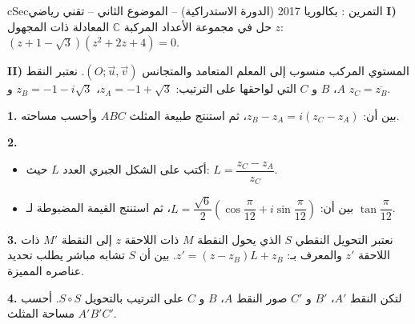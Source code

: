 \documentclass[12pt,a4paper]{article}
\newenvironment{BOX}[2]{\begin{otherlanguage}{english}\begin{arbox}{#1}{#2}}{\end{arbox}\end{otherlanguage}}
\newcounter{exo}
\newenvironment{tamrin}[1]{\stepcounter{exo}\begin{BOX}{cSec}{التمرين \theexo: #1}}{\end{BOX}}
\newenvironment{sq}{\begin{itemize}[leftmargin=2.4em,itemsep=3pt]}{\end{itemize}}
\newcommand{\qa}{\item[(أ)]}\newcommand{\qb}{\item[(ب)]}\newcommand{\qc}{\item[(جـ)]}\newcommand{\qd}{\item[(د)]}\newcommand{\qe}{\item[(هـ)]}
\newcommand{\QQ}[1]{\par\smallskip\textbf{#1.} }
\begin{document}
\begin{tamrin}{بكالوريا 2017 (الدورة الاستدراكية) -- الموضوع الثاني -- تقني رياضي}
\textbf{I)} حل في مجموعة الأعداد المركبة $\mathbb{C}$ المعادلة ذات المجهول $z$: $(z+1-\sqrt3)(z^2+2z+4)=0$.

\textbf{II)} المستوي المركب منسوب إلى المعلم المتعامد والمتجانس $(O;\vec u,\vec v)$. نعتبر النقط $A$، $B$ و $C$ التي لواحقها على الترتيب: $z_A=-1+\sqrt3$، $z_B=-1-i\sqrt3$ و $z_C=\overline{z_B}$.

\QQ{1} بين أن: $z_B-z_A=i(z_C-z_A)$، ثم استنتج طبيعة المثلث $ABC$ وأحسب مساحته.

\QQ{2}
\begin{sq}
\qa أكتب على الشكل الجبري العدد $L$ حيث: $L=\dfrac{z_C-z_A}{z_C}$.
\qb بين أن: $L=\dfrac{\sqrt6}{2}\left(\cos\dfrac{\pi}{12}+i\sin\dfrac{\pi}{12}\right)$، ثم استنتج القيمة المضبوطة لـ $\tan\dfrac{\pi}{12}$.
\end{sq}
\QQ{3} نعتبر التحويل النقطي $S$ الذي يحول النقطة $M$ ذات اللاحقة $z$ إلى النقطة $M'$ ذات اللاحقة $z'$ والمعرف بـ: $z'=(z-z_B)L+z_B$.
بين أن $S$ تشابه مباشر يطلب تحديد عناصره المميزة.

\QQ{4} لتكن النقط $A'$، $B'$ و $C'$ صور النقط $A$، $B$ و $C$ على الترتيب بالتحويل $S\circ S$. أحسب مساحة المثلث $A'B'C'$.
\end{tamrin}
\end{document}
